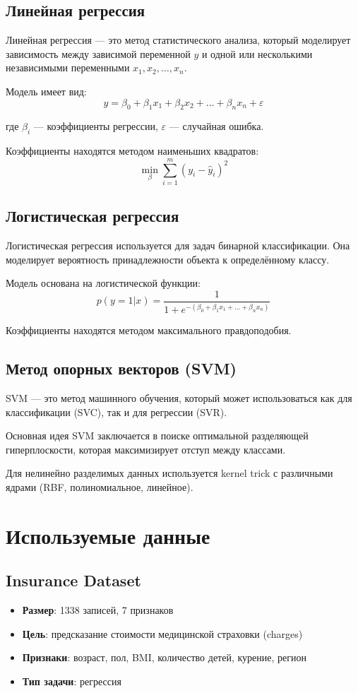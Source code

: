 \documentclass[a4paper]{article}
\begin{document}
\subsection{Линейная регрессия}

Линейная регрессия — это метод статистического анализа, который моделирует зависимость между зависимой переменной $y$ и одной или несколькими независимыми переменными $x_1, x_2, \ldots, x_n$.

Модель имеет вид:
$$y = \beta_0 + \beta_1 x_1 + \beta_2 x_2 + \ldots + \beta_n x_n + \varepsilon$$

где $\beta_i$ — коэффициенты регрессии, $\varepsilon$ — случайная ошибка.

Коэффициенты находятся методом наименьших квадратов:
$$\min_{\beta} \sum_{i=1}^{m} (y_i - \hat{y}_i)^2$$

\subsection{Логистическая регрессия}

Логистическая регрессия используется для задач бинарной классификации. Она моделирует вероятность принадлежности объекта к определённому классу.

Модель основана на логистической функции:
$$p(y=1|x) = \frac{1}{1 + e^{-(\beta_0 + \beta_1 x_1 + \ldots + \beta_n x_n)}}$$

Коэффициенты находятся методом максимального правдоподобия.

\subsection{Метод опорных векторов (SVM)}

SVM — это метод машинного обучения, который может использоваться как для классификации (SVC), так и для регрессии (SVR).

Основная идея SVM заключается в поиске оптимальной разделяющей гиперплоскости, которая максимизирует отступ между классами.

Для нелинейно разделимых данных используется kernel trick с различными ядрами (RBF, полиномиальное, линейное).

\section{Используемые данные}

\subsection{Insurance Dataset}
\begin{itemize}
    \item \textbf{Размер}: 1338 записей, 7 признаков
    \item \textbf{Цель}: предсказание стоимости медицинской страховки (charges)
    \item \textbf{Признаки}: возраст, пол, BMI, количество детей, курение, регион
    \item \textbf{Тип задачи}: регрессия
\end{itemize}
\end{document}

